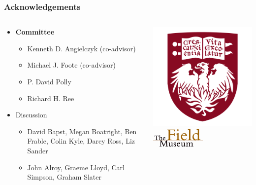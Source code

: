 \documentclass{beamer} \usepackage{amsmath,amsthm}
\begin{document}
\begin{frame}
  \frametitle{Acknowledgements}
  \begin{columns}
    \begin{column}{0.5\textwidth}
      \begin{itemize}
        \item \textbf{Committee}
          \begin{itemize}
            \item Kenneth D. Angielczyk (co-advisor)
            \item Michael J. Foote (co-advisor)
            \item P. David Polly
            \item Richard H. Ree
          \end{itemize}
        \item Discussion
          \begin{itemize}
            \item David Bapst, Megan Boatright, Ben Frable, Colin Kyle, Darcy Ross, Liz Sander
            \item John Alroy, Graeme Lloyd, Carl Simpson, Graham Slater
          \end{itemize}
      \end{itemize}
    \end{column}
    \begin{column}{0.5\textwidth}
      \includegraphics[height = 0.25\textheight, keepaspectratio = true]{figure/chicago} \\
      \includegraphics[height = 0.25\textheight, width = 0.5\textwidth, keepaspectratio = true]{figure/field} \\
    \end{column}
  \end{columns}
\end{frame}
\end{document}
